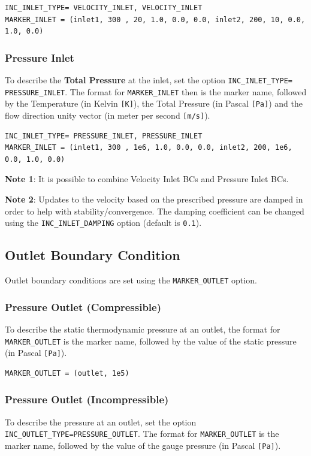 \documentclass[12pt, a4paper, twoside]{article}
\begin{document}
\begin{lstlisting}
INC_INLET_TYPE= VELOCITY_INLET, VELOCITY_INLET
MARKER_INLET = (inlet1, 300 , 20, 1.0, 0.0, 0.0, inlet2, 200, 10, 0.0, 1.0, 0.0)
\end{lstlisting}


\subsubsection{Pressure Inlet}
To describe the \textbf{Total Pressure} at the inlet, set the option \texttt{INC\_INLET\_TYPE= \\PRESSURE\_INLET}. The format for \verb|MARKER_INLET| then is the marker name, followed by the Temperature (in Kelvin \verb|[K]|), the Total Pressure (in Pascal \verb|[Pa]|) and the flow direction unity vector (in meter per second \verb|[m/s]|).

\begin{lstlisting}
INC_INLET_TYPE= PRESSURE_INLET, PRESSURE_INLET
MARKER_INLET = (inlet1, 300 , 1e6, 1.0, 0.0, 0.0, inlet2, 200, 1e6, 0.0, 1.0, 0.0)
\end{lstlisting}

\textbf{Note 1}: It is possible to combine Velocity Inlet BCs and Pressure Inlet BCs.

\textbf{Note 2}: Updates to the velocity based on the prescribed pressure are damped in order to help with stability/convergence. The damping coefficient can be changed using the \verb|INC_INLET_DAMPING| option (default is \verb|0.1|).


\subsection{Outlet Boundary Condition}
Outlet boundary conditions are set using the \verb|MARKER_OUTLET| option.


\subsubsection{Pressure Outlet (Compressible)}
To describe the static thermodynamic pressure at an outlet, the format for \verb|MARKER_OUTLET| is the marker name, followed by the value of the static pressure (in Pascal \verb|[Pa]|).

\begin{lstlisting}
MARKER_OUTLET = (outlet, 1e5)
\end{lstlisting}


\subsubsection{Pressure Outlet (Incompressible)}
To describe the pressure at an outlet, set the option \texttt{INC\_OUTLET\_TYPE=PRESSURE\_OUTLET}. The format for \verb|MARKER_OUTLET| is the marker name, followed by the value of the gauge pressure (in Pascal \verb|[Pa]|).
\end{document}
